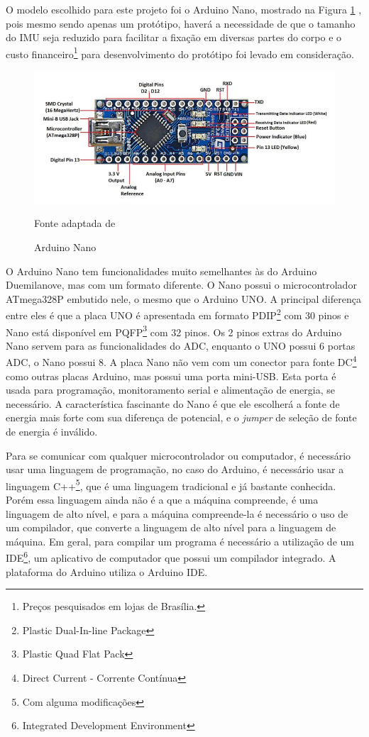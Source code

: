 O  modelo escolhido para este projeto foi o Arduino Nano, mostrado na Figura \ref{arduino} , pois mesmo sendo apenas um protótipo, haverá a necessidade de que o tamanho do IMU seja reduzido para facilitar a fixação em diversas partes do corpo e o custo financeiro\footnote{Preços pesquisados em lojas de Brasília.} para desenvolvimento do protótipo foi levado em consideração.

\begin{figure}[h]
	\centering
	\includegraphics[keepaspectratio=true,scale=0.7
	]{figuras/arduino_nano.png}
	\caption{ Arduino Nano }
	Fonte adaptada de \cite{john2018}
	\label{arduino}	
\end{figure}


O Arduino Nano tem funcionalidades muito semelhantes às do Arduino Duemilanove, mas com um formato diferente. O Nano possui o microcontrolador ATmega328P embutido nele, o mesmo que o Arduino UNO. A principal diferença entre eles é que a placa UNO é apresentada em formato PDIP\footnote{Plastic Dual-In-line Package} com 30 pinos e Nano está disponível em PQFP\footnote{Plastic Quad Flat Pack} com 32 pinos. Os 2 pinos extras do Arduino Nano servem para as funcionalidades do ADC, enquanto o UNO possui 6 portas ADC, o Nano possui 8. A placa Nano não vem com um conector para fonte DC\footnote{Direct Current - Corrente Contínua} como outras placas Arduino, mas possui uma porta mini-USB. Esta porta é usada para programação, monitoramento serial e alimentação de energia, se necessário. A característica fascinante do Nano é que ele escolherá a fonte de energia mais forte com sua diferença de potencial, e o \textit{jumper} de seleção de fonte de energia é inválido\cite{john2018}.  

Para se comunicar com qualquer microcontrolador ou computador, é necessário usar uma linguagem de programação, no caso do Arduino, é necessário usar a linguagem C++\footnote{Com alguma modificações}, que é uma linguagem tradicional e já bastante conhecida. Porém essa linguagem ainda não é a que a máquina compreende, é uma linguagem de alto nível, e para a máquina compreende-la é necessário o uso de um compilador, que converte a linguagem de alto nível para a linguagem de máquina. Em geral, para compilar um programa é necessário a utilização de um IDE\footnote{Integrated Development Environment}, um aplicativo de computador que possui um compilador integrado. A plataforma do Arduino utiliza o Arduino IDE\cite{chavier2016}. 


